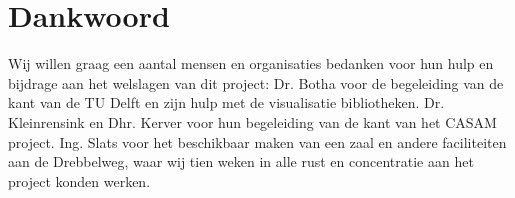 \section{Dankwoord}
\label{Dankwoord}
Wij willen graag een aantal mensen en organisaties bedanken voor hun hulp en bijdrage aan het welslagen van dit project:
Dr. Botha voor de begeleiding van de kant van de TU Delft en zijn hulp met de visualisatie bibliotheken.
Dr. Kleinrensink en Dhr. Kerver voor hun begeleiding van de kant van het CASAM project.
Ing. Slats voor het beschikbaar maken van een zaal en andere faciliteiten aan de Drebbelweg, waar wij tien weken in alle rust en concentratie aan het project konden werken.

